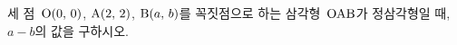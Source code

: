 세 점~$\mathrm{O}(0,\,0)$, $\mathrm{A}(2,\,2)$, $\mathrm{B}(a,\,b)$를 꼭짓점으로 하는 삼각형~$\mathrm{OAB}$가 정삼각형일 때, $a-b$의 값을 구하시오. 
